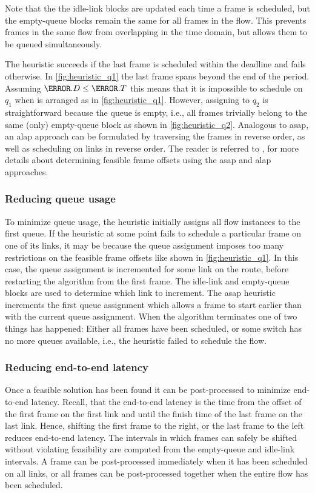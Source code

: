 Note that the the idle-link blocks are updated each time a frame is scheduled, but the empty-queue blocks remain the same for all frames in the flow.
This prevents frames in the same flow from overlapping in the time domain, but allows them to be queued simultaneously.

The heuristic succeeds if the last frame is scheduled within the deadline and fails otherwise. In \autoref{fig:heuristic_q1} the last frame spans beyond the end of the period. Assuming $\s.D \leq \s.T$ this means that it is impossible to schedule \s[2] on $q_1$ when \s[1] is arranged as in \autoref{fig:heuristic_q1}. However, assigning \s[2] to $q_2$ is straightforward because the queue is empty, i.e., all frames trivially belong to the same (only) empty-queue block as shown in \autoref{fig:heuristic_q2}.
Analogous to \gls{asap}, an \gls{alap} approach can be formulated by traversing the frames in reverse order, as well as scheduling on links in reverse order.
The reader is referred to \cite{raagaardthesis}, for more details about determining feasible frame offsets using the \gls{asap} and \gls{alap} approaches.

\subsubsection{Reducing queue usage}
To minimize queue usage, the heuristic initially assigns all flow instances to the first queue. If the heuristic at some point fails to schedule a particular frame on one of its links, it may be because the queue assignment imposes too many restrictions on the feasible frame offsets like shown in \autoref{fig:heuristic_q1}. In this case, the queue assignment is incremented for some link on the route, before restarting the algorithm from the first frame. The idle-link and empty-queue blocks are used to determine which link to increment. The \gls{asap} heuristic increments the first queue assignment which allows a frame to start earlier than with the current queue assignment.
When the algorithm terminates one of two things has happened: Either all frames have been scheduled, or some switch has no more queues available, i.e., the heuristic failed to schedule the flow.

\subsubsection{Reducing end-to-end latency}
Once a feasible solution has been found it can be post-processed to minimize end-to-end latency. Recall, that the end-to-end latency is the time from the offset of the first frame on the first link and until the finish time of the last frame on the last link. Hence, shifting the first frame to the right, or the last frame to the left reduces end-to-end latency. The intervals in which frames can safely be shifted without violating feasibility are computed from the empty-queue and idle-link intervals. A frame can be post-processed immediately when it has been scheduled on all links, or all frames can be post-processed together when the entire flow has been scheduled.

